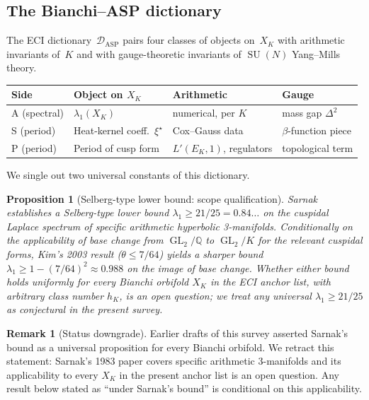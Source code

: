 \documentclass[11pt,a4paper]{article}
\newtheorem{proposition}[theorem]{Proposition}
\theoremstyle{definition}
\newtheorem{remark}[theorem]{Remark}
\DeclareMathOperator{\GL}{GL}
\DeclareMathOperator{\SU}{SU}
\newcommand{\QQ}{\mathbb{Q}}
\begin{document}
\subsection{The Bianchi--ASP dictionary}
\label{sec:ASP}
The ECI dictionary~$\mathcal{D}_{\mathrm{ASP}}$ pairs four classes of
objects on~$X_{K}$ with arithmetic invariants of~$K$ and with
gauge-theoretic invariants of $\SU(N)$ Yang--Mills theory.

\begin{center}
\begin{tabular}{llll}
\toprule
\textbf{Side} & \textbf{Object on $X_{K}$} & \textbf{Arithmetic} & \textbf{Gauge} \\
\midrule
A (spectral) & $\lambda_{1}(X_{K})$ & numerical, per $K$ & mass gap $\Delta^{2}$ \\
S (period)   & Heat-kernel coeff.\ $\xi^{\star}$ & Cox--Gauss data & $\beta$-function piece \\
P (period)   & Period of cusp form & $L'(E_{K},1)$, regulators & topological term \\
\bottomrule
\end{tabular}
\end{center}

We single out two universal constants of this dictionary.

\begin{proposition}[Selberg-type lower bound: scope qualification]
\label{prop:selberg}
Sarnak~\cite{Sarnak1983} establishes a Selberg-type lower bound
$\lambda_{1} \geq 21/25 = 0.84\ldots$ on the cuspidal Laplace spectrum
of \emph{specific} arithmetic hyperbolic 3-manifolds. Conditionally on
the applicability of base change from $\GL_{2}/\QQ$ to $\GL_{2}/K$ for
the relevant cuspidal forms, Kim's 2003 result \cite{Kim2003}
($\theta\leq 7/64$) yields a sharper bound $\lambda_{1}\geq 1 - (7/64)^{2}
\approx 0.988$ on the image of base change. Whether either bound holds
uniformly for every Bianchi orbifold $X_{K}$ in the ECI anchor list,
with arbitrary class number $h_{K}$, is an open question; we treat any
universal $\lambda_{1}\geq 21/25$ as conjectural in the present survey.
\end{proposition}

\begin{remark}[Status downgrade]\label{rem:selberg_downgrade}
Earlier drafts of this survey asserted Sarnak's bound as a universal
proposition for every Bianchi orbifold. We retract this statement: Sarnak's
1983 paper covers specific arithmetic 3-manifolds and its applicability
to every $X_{K}$ in the present anchor list is an open question. Any
result below stated as ``under Sarnak's bound'' is conditional on this
applicability.
\end{remark}
\end{document}
